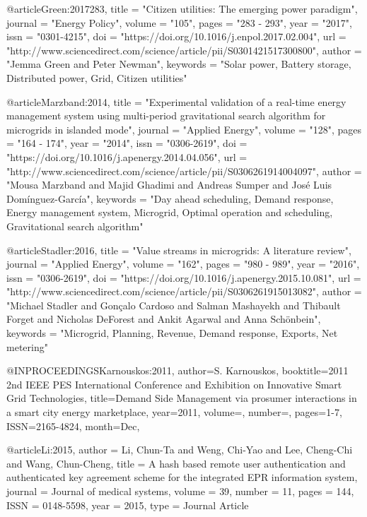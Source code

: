 @article{Green:2017283,
title = "Citizen utilities: The emerging power paradigm",
journal = "Energy Policy",
volume = "105",
pages = "283 - 293",
year = "2017",
issn = "0301-4215",
doi = "https://doi.org/10.1016/j.enpol.2017.02.004",
url = "http://www.sciencedirect.com/science/article/pii/S0301421517300800",
author = "Jemma Green and Peter Newman",
keywords = "Solar power, Battery storage, Distributed power, Grid, Citizen utilities"
}



@article{Marzband:2014,
title = "Experimental validation of a real-time energy management system using multi-period gravitational search algorithm for microgrids in islanded mode",
journal = "Applied Energy",
volume = "128",
pages = "164 - 174",
year = "2014",
issn = "0306-2619",
doi = "https://doi.org/10.1016/j.apenergy.2014.04.056",
url = "http://www.sciencedirect.com/science/article/pii/S0306261914004097",
author = "Mousa Marzband and Majid Ghadimi and Andreas Sumper and José Luis Domínguez-García",
keywords = "Day ahead scheduling, Demand response, Energy management system, Microgrid, Optimal operation and scheduling, Gravitational search algorithm"
}

@article{Stadler:2016,
title = "Value streams in microgrids: A literature review",
journal = "Applied Energy",
volume = "162",
pages = "980 - 989",
year = "2016",
issn = "0306-2619",
doi = "https://doi.org/10.1016/j.apenergy.2015.10.081",
url = "http://www.sciencedirect.com/science/article/pii/S0306261915013082",
author = "Michael Stadler and Gonçalo Cardoso and Salman Mashayekh and Thibault Forget and Nicholas DeForest and Ankit Agarwal and Anna Schönbein",
keywords = "Microgrid, Planning, Revenue, Demand response, Exports, Net metering"
}





@INPROCEEDINGS{Karnouskos:2011, 
author={S. Karnouskos}, 
booktitle={2011 2nd IEEE PES International Conference and Exhibition on Innovative Smart Grid Technologies}, 
title={Demand Side Management via prosumer interactions in a smart city energy marketplace}, 
year={2011}, 
volume={}, 
number={}, 
pages={1-7}, 
ISSN={2165-4824}, 
month={Dec},}

@article{Li:2015,
   author = {Li, Chun-Ta and Weng, Chi-Yao and Lee, Cheng-Chi and Wang, Chun-Cheng},
   title = {A hash based remote user authentication and authenticated key agreement scheme for the integrated EPR information system},
   journal = {Journal of medical systems},
   volume = {39},
   number = {11},
   pages = {144},
   ISSN = {0148-5598},
   year = {2015},
   type = {Journal Article}
}

